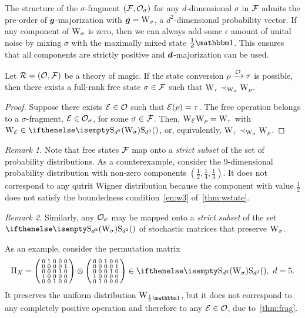 The structure of the $\sigma$-fragment $(\mathcal{F}, \mathcal{O}_\sigma)$ for any $d$-dimensional $\sigma$ in $\mathcal{F}$ admits the pre-order of $\bm{g}$-majorization with $\bmg = \W{\sigma}$, a $d^2$-dimensional probability vector. 
If any component of $\W{\sigma}$ is zero, then we can always add some $\epsilon$ amount of unital noise by mixing $\sigma$ with the maximally mixed state $\frac{1}{d}\id$. 
This ensures that all components are strictly positive and $\bm{d}$-majorization can be used.

\begin{proposition}
    Let $\mathcal{R} = (\mathcal{O}, \mathcal{F})$ be a theory of magic.
    If the state conversion $\rho \xrightarrow{\mathcal{O}} \tau$ is possible, then there exists a full-rank free state $\sigma \in \mathcal{F}$ such that $\W{\tau} \prec_{\W{\sigma}} \W{\rho}$.
\end{proposition}
\begin{proof}
    Suppose there exists $\mathcal{E} \in \mathcal{O}$ such that $\mathcal{E}(\rho) = \tau$.
    The free operation belongs to a $\sigma$-fragment, $\mathcal{E} \in \mathcal{O}_\sigma$, for some $\sigma \in \mathcal{F}$.
    Then, $\W{\E}\W{\rho} = \W{\tau}$ with $\W{\E} \in \stochw$, or, equivalently, $\W{\tau} \prec_{\W{\sigma}} \W{\rho}$.
\end{proof}

\emph{Remark 1.} Note that free states $\mathcal{F}$ map onto a \emph{strict subset} of the set of probability distributions.
As a counterexample, consider the 9-dimensional probability distribution with non-zero components $\left(\frac{1}{2}, \frac{1}{4}, \frac{1}{4} \right)$. 
It does not correspond to any qutrit Wigner distribution because the component with value $\frac{1}{2}$ does not satisfy the boundedness condition~\ref{en:w3} of~\cref{thm:wstate}.

\emph{Remark 2.} Similarly, any $\mathcal{O}_\sigma$ may be mapped onto a \emph{strict subset} of the set $\stochw$ of stochastic matrices that preserve $\W{\sigma}{}$.

As an example, consider the permutation matrix
\begin{equation}
    \Pi_X = \begin{psmallmatrix}
        0 & 1 & 0 & 0 & 0 \\
        0 & 0 & 0 & 0 & 1 \\
        0 & 0 & 0 & 1 & 0 \\
        1 & 0 & 0 & 0 & 0 \\
        0 & 0 & 1 & 0 & 0
    \end{psmallmatrix} \otimes \begin{psmallmatrix}
        0 & 0 & 1 & 0 & 0 \\
        0 & 0 & 0 & 0 & 1 \\
        0 & 0 & 0 & 1 & 0 \\
        1 & 0 & 0 & 0 & 0 \\
        0 & 1 & 0 & 0 & 0    
    \end{psmallmatrix} \in \stochw,\ d=5.
\end{equation}
It preserves the uniform distribution $\W{\frac{1}{5}\id}{}$, but it does not correspond to any completely positive operation and therefore to any $\mathcal{E} \in \mathcal{O}$, due to~\cref{thm:frag}.

